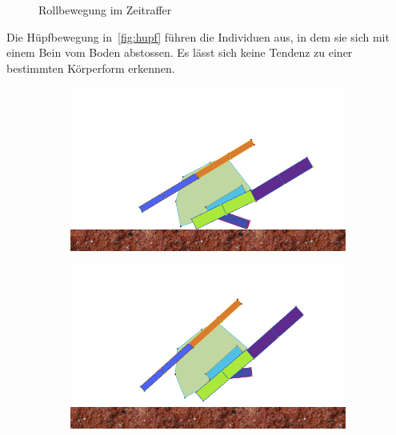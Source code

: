 \begin{figure}[H]
        \caption{Rollbewegung im Zeitraffer\label{fig:roll}}

      \end{figure}

      Die Hüpfbewegung in~\vref{fig:hupf} führen die Individuen aus, in dem sie sich mit einem Bein vom Boden abstossen.
      Es lässt sich keine Tendenz zu einer bestimmten Körperform erkennen.

      \begin{figure}[H]
        \centering

        \begin{subfigure}[b]{0.3\textwidth}
          \includegraphics[width=\linewidth,center]{graphics/simulation-discussion/hupf_1}
          \caption{\label{fig:hupf_1}}
        \end{subfigure}
        \hspace{\fill}
        \begin{subfigure}[b]{0.3\textwidth}
          \includegraphics[width=\linewidth,center]{graphics/simulation-discussion/hupf_2}
          \caption{\label{fig:hupf_2}}

\end{subfigure}
\end{figure}
